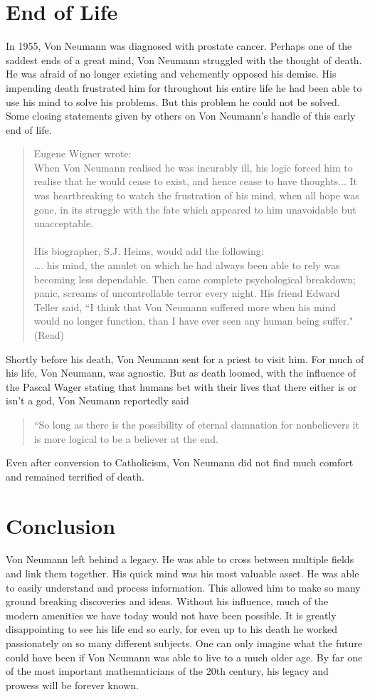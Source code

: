 \documentclass[12pt]{article}
\begin{document}
\section*{End of Life}
In 1955, Von Neumann was diagnosed with prostate cancer. Perhaps one of the saddest ends of a great mind, Von Neumann struggled with the thought of death. He was afraid of no longer existing and vehemently opposed his demise. His impending death frustrated him for throughout his entire life he had been able to use his mind to solve his problems. But this problem he could not be solved. Some closing statements given by others on Von Neumann's handle of this early end of life.
\begin{quotation}
	Eugene Wigner wrote:\\
	When Von Neumann realised he was incurably ill, his logic forced
	him to realise that he would cease to exist, and hence cease to have
	thoughts... It was heartbreaking to watch the frustration of his mind,
	when all hope was gone, in its struggle with the fate which appeared
	to him unavoidable but unacceptable.\\
	\\
	His biographer, S.J. Heims, would add the following:\\
	\dots. his mind, the amulet on which he had always been able to rely was becoming less dependable. Then came complete psychological breakdown; panic, screams of uncontrollable terror every night. His friend Edward Teller said, ``I think that Von Neumann suffered more when his mind would no longer function, than I have ever seen any human being suffer." (Read)
\end{quotation}
Shortly before his death, Von Neumann sent for a priest to visit him. For much of his life, Von Neumann, was agnostic. But as death loomed, with the influence of the Pascal Wager stating that humans bet with their lives that there either is or isn't a god, Von Neumann reportedly said
\begin{quotation}
	 ``So long as there is the possibility of eternal damnation for nonbelievers it is more logical to be a believer at the end.
\end{quotation}
Even after conversion to Catholicism, Von Neumann did not find much comfort and remained terrified of death.
\section*{Conclusion}
	Von Neumann left behind a legacy. He was able to cross between multiple fields and link them together. His quick mind was his most valuable asset. He was able to easily understand and process information. This allowed him to make so many ground breaking discoveries and ideas. Without his influence, much of the modern amenities we have today would not have been possible. It is greatly disappointing to see his life end so early, for even up to his death he worked passionately on so many different subjects. One can only imagine what the future could have been if Von Neumann was able to live to a much older age. By far one of the most important mathematicians of the 20th century, his legacy and prowess will be forever known.
	
\end{document}

